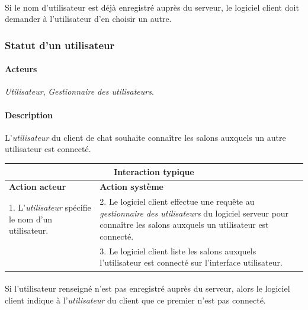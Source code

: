 \documentclass[a4paper]{article}
\begin{document}
    \paragraph{}Si le nom d'utilisateur est déjà enregistré auprès du serveur,
    le logiciel client doit demander à l'utilisateur d'en choisir un autre.

   \subsubsection{Statut d'un utilisateur}
    \paragraph{Acteurs} \textit{Utilisateur},
    \textit{Gestionnaire des utilisateurs}.

    \paragraph{Description} L'\textit{utilisateur} du client de chat souhaite
    connaître les salons auxquels un autre utilisateur est connecté.

    \begin{center}
        \begin{tabular}{|p{6cm}|p{6cm}|}
            \hline
            \multicolumn{2}{|c|}{\textbf{Interaction typique}} \\ \hline
            \textbf{Action acteur} & \textbf{Action système} \\ \hline
            1. L'\textit{utilisateur} spécifie le nom d'un utilisateur. &
            2. Le logiciel client effectue une requête au
            \textit{gestionnaire des utilisateurs} du logiciel serveur pour
            connaître les salons auxquels un utilisateur est connecté. \\
            & 3. Le logiciel client liste les salons auxquels l'utilisateur
            est connecté sur l'interface utilisateur. \\
            \hline
        \end{tabular}
    \end{center}

    \paragraph{}Si l'utilisateur renseigné n'est pas enregistré auprès du
    serveur, alors le logiciel client indique à l'\textit{utilisateur} du client
    que ce premier n'est pas connecté.
\end{document}
